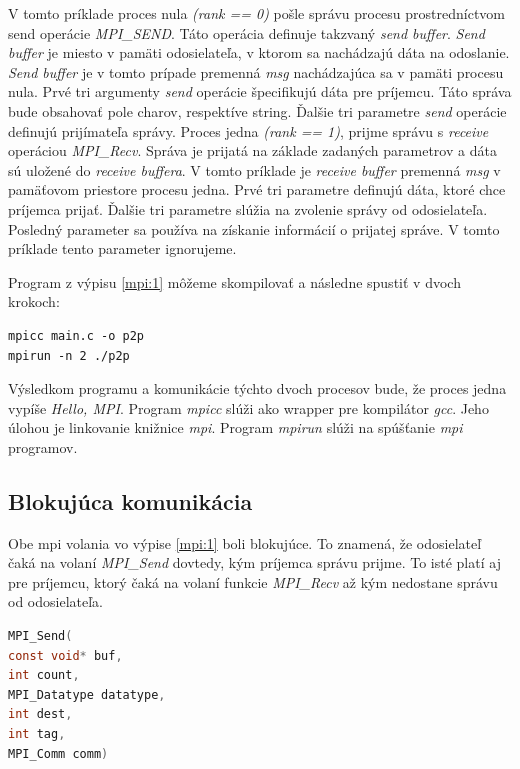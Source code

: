 V tomto príklade proces nula \textit{(rank == 0)} pošle správu procesu prostredníctvom send operácie \textit{MPI\_SEND}.
Táto operácia definuje takzvaný \textit{send buffer}. \textit{Send buffer} je miesto v pamäti
odosielateľa, v ktorom sa nachádzajú dáta na odoslanie.
\textit{Send buffer} je v tomto prípade premenná \textit{msg} nachádzajúca sa v pamäti procesu nula.
Prvé tri argumenty \textit{send} operácie špecifikujú dáta pre príjemcu. Táto správa bude obsahovať pole charov, respektíve string.
Ďalšie tri parametre \textit{send} operácie definujú prijímateľa správy.
Proces jedna \textit{(rank == 1)}, prijme správu s \textit{receive} operáciou \textit{MPI\_Recv}.
Správa je prijatá na základe zadaných parametrov a dáta sú uložené do \textit{receive buffera}.
V tomto príklade je \textit{receive buffer} premenná \textit{msg} v pamäťovom priestore procesu jedna.
Prvé tri parametre definujú dáta, ktoré chce príjemca prijať. Ďalšie tri parametre slúžia na zvolenie správy od odosielateľa.
Posledný parameter sa používa na získanie informácií o prijatej správe. V tomto príklade tento parameter ignorujeme.

Program z výpisu \ref{mpi:1} môžeme skompilovať a následne spustiť v dvoch krokoch:
\begin{lstlisting}
mpicc main.c -o p2p
mpirun -n 2 ./p2p
\end{lstlisting}
Výsledkom programu a komunikácie týchto dvoch procesov bude, že proces jedna vypíše \textit{Hello, MPI}. Program \textit{mpicc} slúži ako wrapper pre kompilátor \textit{gcc}. Jeho úlohou je linkovanie knižnice \textit{mpi}. Program \textit{mpirun} slúži na spúšťanie \textit{mpi} programov.

\subsection{Blokujúca komunikácia}
Obe \acrshort{mpi} volania vo výpise \ref{mpi:1} boli blokujúce.
To znamená, že odosielateľ čaká na volaní \textit{MPI\_Send} dovtedy, kým príjemca správu prijme.
To isté platí aj pre príjemcu, ktorý čaká na volaní funkcie \textit{MPI\_Recv}  až kým nedostane správu od odosielateľa.

\begin{lstlisting}[language=c, caption={MPI\_Send}, label={mpi:send}]
MPI_Send(
const void* buf,
int count,
MPI_Datatype datatype,
int dest,
int tag,
MPI_Comm comm)
\end{lstlisting}

